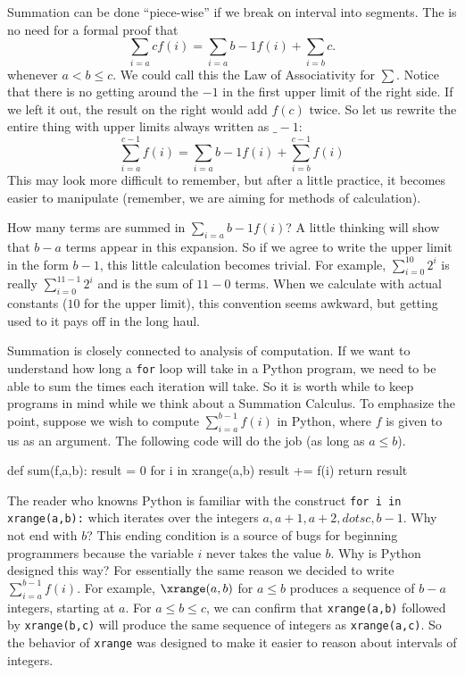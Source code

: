 Summation can be done ``piece-wise'' if we break on interval into segments. The is no need for a formal proof that
\[\sum_{i=a}c f(i) = \sum_{i=a}{b-1}f(i) + \sum_{i=b}c.\]
whenever $a<b\leq c$. We could call this the Law of Associativity for $\sum$. Notice that there is no getting around the $-1$ in the first upper limit of the right side. If we left it out, the result on the right would add $f(c)$ twice. So let us rewrite the entire thing with upper limits always written as $\_ - 1$:
\[\sum_{i=a}^{c-1}f(i) = \sum_{i=a}{b-1}f(i) + \sum_{i=b}^{c-1} f(i)\]
This may look more difficult to remember, but after a little practice, it becomes easier to manipulate (remember, we are aiming for methods of calculation).

How many terms are summed in $\sum_{i=a}{b-1}f(i)$? A little thinking will show that $b-a$ terms appear in this expansion. So if we agree to write the upper limit in the form $b-1$, this little calculation becomes trivial.
For example, $\sum_{i=0}^{10}2^i$ is really $\sum_{i=0}^{11-1} 2^i$ and is the sum of $11-0$ terms. When we calculate with actual constants ($10$ for the upper limit), this convention seems awkward, but getting used to it pays off in the long haul.

Summation is closely connected to analysis of computation. 
If we want to understand how long a \lstinline|for| loop will take in a Python program, we need to be able to sum the times each iteration will take. 
So it is worth while to keep programs in mind while we think about a Summation Calculus. To emphasize the point, suppose we wish to compute $\sum_{i=a}^{b-1} f(i)$ in Python, where $f$ is given to us as an argument. The following code will do the job (as long as $a\leq b$).

\begin{listlisting}
	def sum(f,a,b):
		result = 0
		for i in xrange(a,b)
			result += f(i)
		return result
\end{listlisting}


The reader who knowns Python is familiar with the construct \lstinline|for i in xrange(a,b):| which iterates over the integers $a, a+1, a+2, dotsc, b-1$. Why not end with $b$? This ending condition is a source of bugs for beginning programmers because the variable $i$ never takes the value $b$. Why is Python designed this way? For essentially the same reason we decided to write $\sum_{i=a}^{b-1}f(i)$. For example, $\xrange(a,b)$ for $a\leq b$
produces a sequence of $b-a$ integers, starting at $a$. For $a\leq b\leq c$, we can confirm that \lstinline|xrange(a,b)| followed by \lstinline|xrange(b,c)| will produce the same sequence of integers as \lstinline|xrange(a,c)|. So the behavior of \lstinline|xrange| was designed to make it easier to reason about intervals of integers.

